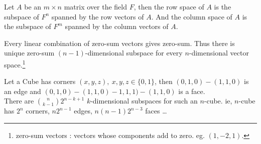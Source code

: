 	\begin{definition}
		Let $A$ be an $m \times n$ matrix over the field $F$, then the row space of $A$ is the subspace of $F^n$ spanned by the row vectors of $A$. And the column space of $A$ is the subspace of $F^m$ spanned by the column vectors of $A$.
	\end{definition}
	\begin{remark}
		Every linear combination of zero-sum vectors gives zero-sum. Thus there is unique zero-sum $(n-1)$-dimensional subspace for every $n$-dimensional vector space.\footnote{zero-sum vectors\cite{strang1} : vectors whose components add to zero. eg. $(1,-2,1)$.}
	\end{remark}
	\begin{remark}
		Let a Cube has corners $(x,y,z),\ x,y,z \in \{ 0,1 \}$, then $(0,1,0)-(1,1,0)$ is an edge and $(0,1,0)-(1,1,0)-1,1,1)-(1,1,0)$ is a face.\\
		There are $\binom{n}{k-1} 2^{n-k+1}$ $k$-dimensional subspaces for such an $n$-cube. ie, $n$-cube has $2^{n}$ corners, $n2^{n-1}$ edges, $n(n-1)2^{n-3}$ faces \dots
	\end{remark}


